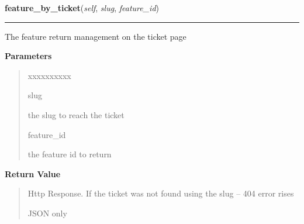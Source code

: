 \hspace{.8\funcindent}\begin{boxedminipage}{\funcwidth}

    \raggedright \textbf{feature\_by\_ticket}(\textit{self}, \textit{slug}, \textit{feature\_id})

    \vspace{-1.5ex}

    \rule{\textwidth}{0.5\fboxrule}
\setlength{\parskip}{2ex}
    The feature return management on the ticket page

\setlength{\parskip}{1ex}
      \textbf{Parameters}
      \vspace{-1ex}

      \begin{quote}
        \begin{Ventry}{xxxxxxxxxx}

          \item[slug]

          the slug to reach the ticket

          \item[feature\_id]

          the feature id to return

        \end{Ventry}

      \end{quote}

      \textbf{Return Value}
    \vspace{-1ex}

      \begin{quote}
      Http Response. If the ticket was not found using the slug -- 404 
      error rises

      JSON only

      \end{quote}

    \end{boxedminipage}

    \label{morbid:views:feature_by_analytic}

    \vspace{0.5ex}

